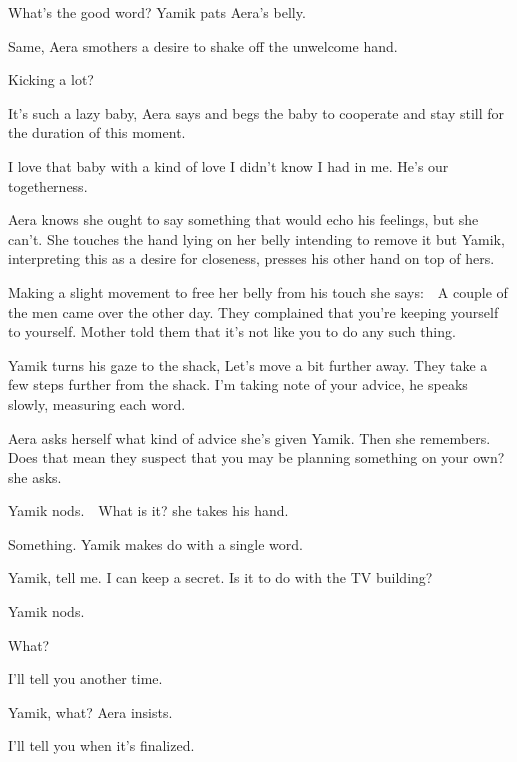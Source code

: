\documentclass[twoside,11pt]{book}
\begin{document}
{\textquotedbl}What's the good word?{\textquotedbl} Yamik pats Aera's belly. 

{\textquotedbl}Same,{\textquotedbl} Aera smothers a desire to shake off the unwelcome hand. 

{\textquotedbl}Kicking a lot?{\textquotedbl} 

{\textquotedbl}It's such a lazy baby,{\textquotedbl} Aera says and begs the baby to cooperate and stay still for the
duration of this moment. 

{\textquotedbl}I love that baby with a kind of love I didn't know I had in me. He's our togetherness.{\textquotedbl}

Aera knows she ought to say something that would echo his feelings, but she can't. She touches the hand lying on her
belly intending to remove it but Yamik, interpreting this as a desire for closeness, presses his other hand on top of
hers. 

Making a slight movement to free her belly from his touch she says:\ \ {\textquotedbl}A couple of the men came over the
other day. They complained that you're keeping yourself to yourself. Mother told them that it's not like you to do any
such thing.{\textquotedbl} 

Yamik turns his gaze to the shack, {\textquotedbl}Let's move a bit further away.{\textquotedbl} They take a few steps
further from the shack. {\textquotedbl}I'm taking note of your advice,{\textquotedbl} he speaks slowly, measuring each
word. 

Aera asks herself what kind of advice she{}'s given Yamik. Then she remembers. {\textquotedbl}Does that mean they
suspect that you may be planning something on your own?{\textquotedbl} she asks.

Yamik nods.\ \ {\textquotedbl}What is it?{\textquotedbl} she takes his hand. 

{\textquotedbl}Something.{\textquotedbl} Yamik makes do with a single word. 

{\textquotedbl}Yamik, tell me. I can keep a secret. Is it to do with the TV building?{\textquotedbl} 

Yamik nods. 

{\textquotedbl}What?{\textquotedbl} 

{\textquotedbl}I'll tell you another time.{\textquotedbl} 

{\textquotedbl}Yamik, what?{\textquotedbl} Aera insists.

{\textquotedbl}I'll tell you when it's finalized.{\textquotedbl} 
\end{document}
